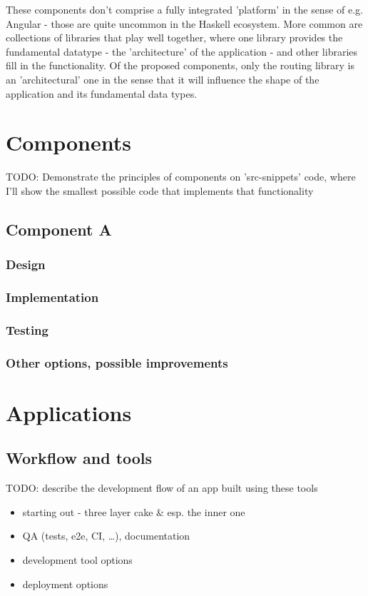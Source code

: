 \documentclass[english,odsaz]{fitthesis}
\begin{document}
These components don't comprise a fully integrated 'platform' in the sense of
e.g. Angular - those are quite uncommon in the Haskell ecosystem. More common
are collections of libraries that play well together, where one library provides
the fundamental datatype - the 'architecture' of the application - and other
libraries fill in the functionality. Of the proposed components, only the
routing library is an 'architectural' one in the sense that it will influence
the shape of the application and its fundamental data types.

\chapter{Components}
\label{sec:orgc985f06}
TODO: Demonstrate the principles of components on 'src-snippets' code, where
I'll show the smallest possible code that implements that functionality

\section{Component A}
\label{sec:org322e858}
\subsection{Design}
\label{sec:org76c77a5}
\subsection{Implementation}
\label{sec:org4dc70b4}
\subsection{Testing}
\label{sec:org3fa4cdb}
\subsection{Other options, possible improvements}
\label{sec:org8657a3d}

\chapter{Applications}
\label{sec:orgd0b43a6}
\section{Workflow and tools}
\label{sec:orge5e4289}
TODO: describe the development flow of an app built using these tools

\begin{itemize}
\item starting out - three layer cake \& esp. the inner one
\item QA (tests, e2e, CI, \ldots{}), documentation
\item development tool options
\item deployment options
\end{itemize}
\end{document}
